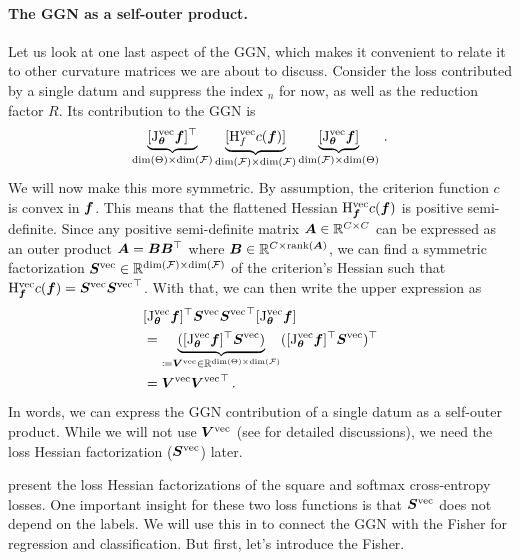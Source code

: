 \paragraph{The GGN as a self-outer product.}
Let us look at one last aspect of the GGN, which makes it convenient to relate it to other curvature matrices we are about to discuss.
Consider the loss contributed by a single datum and suppress the index $_n$ for now, as well as the reduction factor $R$.
Its contribution to the GGN is
\begin{align*}
  \underbrace{[\mathrm{J}_{{\bm{\theta}}}^{\operatorname{vec}} {\bm{f}}]^{\top}}_{\dim(\Theta) \times \dim({\mathcal{F}})}
  \underbrace{[\mathrm{H}^{\operatorname{vec}}_{f} c({\bm{f}})]}_{\dim({\mathcal{F}}) \times \dim({\mathcal{F}})}
  \underbrace{[\mathrm{J}_{{\bm{\theta}}}^{\operatorname{vec}} {\bm{f}}]}_{\dim({\mathcal{F}}) \times \dim(\Theta)}\,.
\end{align*}
We will now make this more symmetric.
By assumption, the criterion function $c$ is convex in ${\bm{f}}$.
This means that the flattened Hessian $\mathrm{H}^{\operatorname{vec}}_{{\bm{f}}} c({\bm{f}})$ is positive semi-definite.
Since any positive semi-definite matrix ${\bm{A}} \in {\mathbb{R}}^{C \times C}$ can be expressed as an outer product ${\bm{A}} = {\bm{B}} {\bm{B}}^{\top}$ where ${\bm{B}} \in {\mathbb{R}}^{C \times \operatorname{rank}({\bm{A}})}$, we can find a symmetric factorization ${\bm{S}}^{\operatorname{vec}} \in {\mathbb{R}}^{\dim({\mathcal{F}}) \times \dim({\mathcal{F}})}$ of the criterion's Hessian such that $\mathrm{H}^{\operatorname{vec}}_{{\bm{f}}} c({\bm{f}}) = {\bm{S}}^{\operatorname{vec}} {{\bm{S}}^{\operatorname{vec}}}^{\top}$.
With that, we can then write the upper expression as
\begin{align*}
  &[\mathrm{J}_{{\bm{\theta}}}^{\operatorname{vec}} {\bm{f}}]^{\top} {\bm{S}}^{\operatorname{vec}} {{\bm{S}}^{\operatorname{vec}}}^{\top} [\mathrm{J}_{{\bm{\theta}}}^{\operatorname{vec}} {\bm{f}}]
  \\
  &=
    \underbrace{([\mathrm{J}_{{\bm{\theta}}}^{\operatorname{vec}} {\bm{f}}]^{\top} {\bm{S}}^{\operatorname{vec}})}_{\coloneq {\bm{V}}^{\operatorname{vec}} \in {\mathbb{R}}^{\dim(\Theta) \times \dim({\mathcal{F}})}}
    ([\mathrm{J}_{{\bm{\theta}}}^{\operatorname{vec}} {\bm{f}}]^{\top} {\bm{S}}^{\operatorname{vec}})^{\top}
  \\
  &=
    {\bm{V}}^{\operatorname{vec}} {{\bm{V}}^{\operatorname{vec}}}^{\top}\,.
\end{align*}
In words, we can express the GGN contribution of a single datum as a self-outer product.
While we will not use ${\bm{V}}^{\operatorname{vec}}$ (see \eg \citet{dangel2022vivit,ren2019efficient} for detailed discussions), we need the loss Hessian factorization (${\bm{S}}^{\operatorname{vec}}$) later.

 present the loss Hessian factorizations of the square and softmax cross-entropy losses.
One important insight for these two loss functions is that ${\bm{S}}^{\operatorname{vec}}$ does not depend on the labels.
We will use this in  to connect the GGN with the Fisher for regression and classification.
But first, let's introduce the Fisher.

